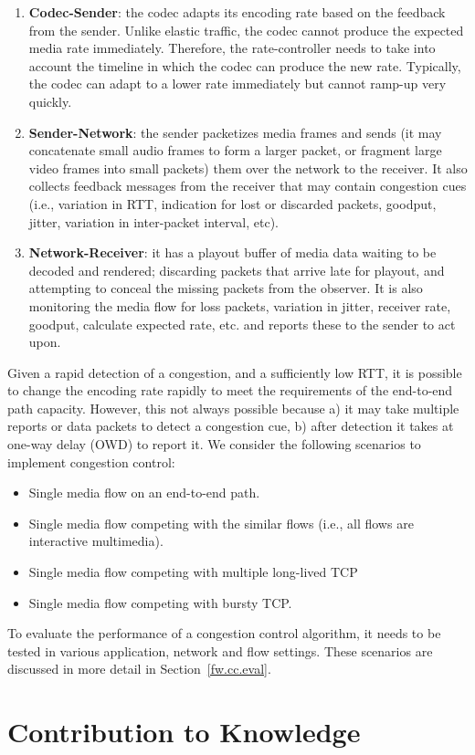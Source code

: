 \begin{enumerate}

\item \textbf{Codec-Sender}: the codec adapts its encoding rate based on the feedback
from the sender. Unlike elastic traffic, the codec cannot produce the expected
media rate immediately. Therefore, the rate-controller needs to take into
account the timeline in which the codec can produce the new rate. Typically,
the codec can adapt to a lower rate immediately but cannot ramp-up very
quickly.

\item \textbf{Sender-Network}: the sender packetizes media frames and sends
(it may concatenate small audio frames to form a larger packet, or fragment
large video frames into small packets) them over the network to the receiver.
It also collects feedback messages from the receiver that may contain
congestion cues (i.e., variation in RTT, indication for lost or discarded
packets, goodput, jitter, variation in inter-packet interval, etc).

\item \textbf{Network-Receiver}: it has a playout buffer of media data waiting
to be decoded and rendered; discarding packets that arrive late for playout,
and attempting to conceal the missing packets from the observer. It is  also
monitoring the media flow for loss packets, variation in jitter, receiver
rate, goodput, calculate expected rate, etc. and reports these to the sender
to act upon.

\end{enumerate}

Given a rapid detection of a congestion, and a sufficiently low RTT, it is
possible to change the encoding rate rapidly to meet the requirements of the
end-to-end path capacity. However, this not always possible because a)
it may take multiple reports or data packets to detect a congestion cue, b)
after detection it takes at one-way delay (OWD) to report it. We consider the 
following scenarios to implement congestion control:

\begin{itemize}
\item Single media flow on an end-to-end path.
\item Single media flow competing with the similar flows (i.e., all flows are
interactive multimedia).
\item Single media flow competing with multiple long-lived TCP
\item Single media flow competing with bursty TCP.
\end{itemize}

To evaluate the performance of a congestion control algorithm, it needs to be
tested in various application, network and flow settings. These scenarios
are discussed in more detail in Section~\ref{fw.cc.eval}.

\section{Contribution to Knowledge}
